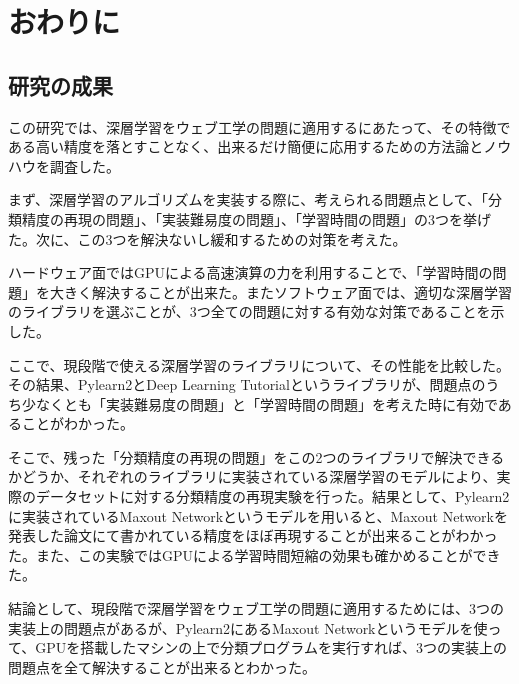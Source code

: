 \chapter{おわりに}
\section{研究の成果}

この研究では、深層学習をウェブ工学の問題に適用するにあたって、その特徴である高い精度を落とすことなく、出来るだけ簡便に応用するための方法論とノウハウを調査した。\par
まず、深層学習のアルゴリズムを実装する際に、考えられる問題点として、「分類精度の再現の問題」、「実装難易度の問題」、「学習時間の問題」の3つを挙げた。次に、この3つを解決ないし緩和するための対策を考えた。\par
ハードウェア面ではGPUによる高速演算の力を利用することで、「学習時間の問題」を大きく解決することが出来た。またソフトウェア面では、適切な深層学習のライブラリを選ぶことが、3つ全ての問題に対する有効な対策であることを示した。\par
ここで、現段階で使える深層学習のライブラリについて、その性能を比較した。その結果、Pylearn2とDeep Learning Tutorialというライブラリが、問題点のうち少なくとも「実装難易度の問題」と「学習時間の問題」を考えた時に有効であることがわかった。\par
そこで、残った「分類精度の再現の問題」をこの2つのライブラリで解決できるかどうか、それぞれのライブラリに実装されている深層学習のモデルにより、実際のデータセットに対する分類精度の再現実験を行った。結果として、Pylearn2に実装されているMaxout Networkというモデルを用いると、Maxout Networkを発表した論文にて書かれている精度をほぼ再現することが出来ることがわかった。また、この実験ではGPUによる学習時間短縮の効果も確かめることができた。\par
結論として、現段階で深層学習をウェブ工学の問題に適用するためには、3つの実装上の問題点があるが、Pylearn2にあるMaxout Networkというモデルを使って、GPUを搭載したマシンの上で分類プログラムを実行すれば、3つの実装上の問題点を全て解決することが出来るとわかった。

